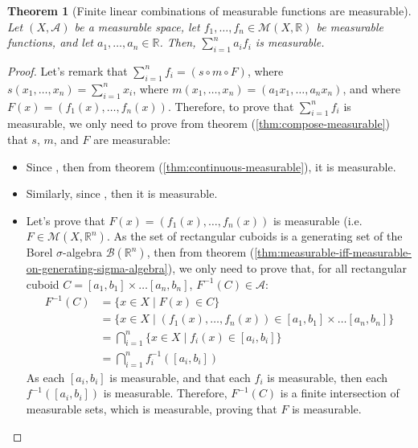 \documentclass{article}
\newtheorem{theorem}{Theorem}[section]
\theoremstyle{definition}
\theoremstyle{remark}
\theoremstyle{example}
\theoremstyle{notation}
\theoremstyle{axiom}
\begin{document}
\begin{theorem}[Finite linear combinations of measurable functions are measurable] \label{thm:linear-combination-measurable} %
		Let $(X, \mathcal{A})$ be a measurable space, let $f_1, \dots, f_n \in \mathcal{M}(X, \mathbb{R})$ be measurable functions, and let $a_1, \dots, a_n \in \mathbb{R}$. Then, $\sum_{i=1}^n a_i f_i$ is measurable.
\end{theorem}

\begin{proof}
		Let's remark that $\sum_{i=1}^n f_i = (s \circ m \circ F)$, where $s(x_1, \dots, x_n) = \sum_{i=1}^n x_i$, where $m(x_1, \dots, x_n) = (a_1 x_1, \dots, a_n x_n)$, and where $F(x) = (f_1(x), \dots, f_n(x))$. Therefore, to prove that $\sum_{i=1}^n f_i$ is measurable, we only need to prove from theorem (\ref{thm:compose-measurable}) that $s$, $m$, and $F$ are measurable:
		\begin{itemize}
				\item Since , then from theorem (\ref{thm:continuous-measurable}), it is measurable.
				\item Similarly, since , then it is measurable.
				\item Let's prove that $F(x) = (f_1(x), \dots, f_n(x))$ is measurable (i.e. $F \in \mathcal{M}(X, \mathbb{R}^n)$. As the set of rectangular cuboids is a generating set of the Borel $\sigma$-algebra $\mathcal{B}(\mathbb{R}^n)$, then from theorem (\ref{thm:measurable-iff-measurable-on-generating-sigma-algebra}), we only need to prove that, for all rectangular cuboid $C = [a_1, b_1] \times \dots [a_n, b_n]$, $F^{-1}(C) \in \mathcal{A}$:
				\begin{align*}
						F^{-1}(C) &= \{x \in X \mid F(x) \in C\}\\
						  &= \{x \in X \mid (f_1(x), \dots, f_n(x)) \in [a_1, b_1] \times \dots [a_n, b_n]\}\\
						  &= \bigcap_{i=1}^n \{x \in X \mid f_i(x) \in [a_i, b_i]\}\\
						  &= \bigcap_{i=1}^n f_i^{-1}([a_i, b_i])
				\end{align*}
				As each $[a_i, b_i]$ is measurable, and that each $f_i$ is measurable, then each $f^{-1}([a_i, b_i])$ is measurable. Therefore, $F^{-1}(C)$ is a finite intersection of measurable sets, which is measurable, proving that $F$ is measurable.
		\end{itemize}
\end{proof}
\end{document}
